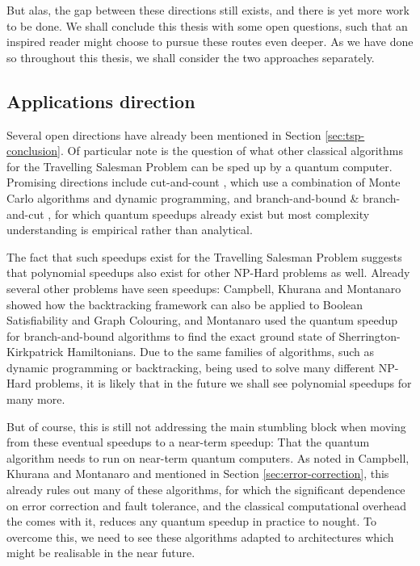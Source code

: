 But alas, the gap between these directions still exists, and there is yet more work to be done. We shall conclude this thesis with some open questions, such that an inspired reader might choose to pursue these routes even deeper. As we have done so throughout this thesis, we shall consider the two approaches separately.

\subsection{Applications direction}

Several open directions have already been mentioned in Section \ref{sec:tsp-conclusion}. Of particular note is the question of what other classical algorithms for the Travelling Salesman Problem can be sped up by a quantum computer. Promising directions include cut-and-count \cite{bjorklund14,bodlaender15,cygan11}, which use a combination of Monte Carlo algorithms and dynamic programming, and branch-and-bound \& branch-and-cut \cite{little1963, padberg1991, applegate2006}, for which quantum speedups already exist but most complexity understanding is empirical rather than analytical.

The fact that such speedups exist for the Travelling Salesman Problem suggests that polynomial speedups also exist for other NP-Hard problems as well. Already several other problems have seen speedups: Campbell, Khurana and Montanaro \cite{campbell2019} showed how the backtracking framework can also be applied to Boolean Satisfiability and Graph Colouring, and Montanaro \cite{montanaro2019} used the quantum speedup for branch-and-bound algorithms to find the exact ground state of Sherrington-Kirkpatrick Hamiltonians. Due to the same families of algorithms, such as dynamic programming or backtracking, being used to solve many different NP-Hard problems, it is likely that in the future we shall see polynomial speedups for many more.

But of course, this is still not addressing the main stumbling block when moving from these eventual speedups to a near-term speedup: That the quantum algorithm needs to run on near-term quantum computers. As noted in Campbell, Khurana and Montanaro \cite{campbell2019} and mentioned in Section \ref{sec:error-correction}, this already rules out many of these algorithms, for which the significant dependence on error correction and fault tolerance, and the classical computational overhead the comes with it, reduces any quantum speedup in practice to nought. To overcome this, we need to see these algorithms adapted to architectures which might be realisable in the near future.

